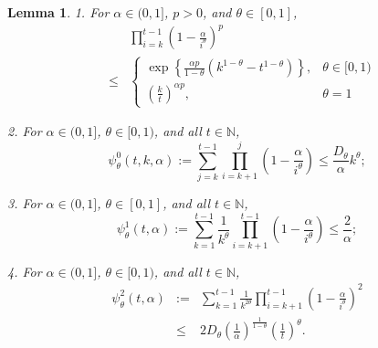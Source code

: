 \documentclass[twoside,twocolumn,journal]{IEEEtran}
\newtheorem{lem}[thm]{Lemma}
\newcommand{\DS}{\displaystyle}
\def\N{{\mathbb N}}
\begin{document}
%
%

\begin{lem} \label{lem:estimates}
1. For $\alpha\in (0,1]$, $p>0$, and $\theta\in [0,1]$,
\begin{eqnarray*}
& & \prod_{i=k}^{t-1} \left(1-\frac{\alpha}{i^\theta}\right)^p \\
& \leq & \DS
\left\{
\begin{array}{ll}
\DS \exp\left\{\frac{\alpha p}{1-\theta} (k^{1-\theta}-t^{1-\theta})\right\}, & \theta\in [0,1) \\
\DS \left(\frac{k}{t}\right)^{\alpha p}, & \theta = 1
\end{array}
\right.
\end{eqnarray*}

2. For $\alpha\in (0,1]$, $\theta\in [0,1)$, and all $t\in \N$,
\[ \psi^0_\theta(t,k,\alpha):=\sum_{j=k}^{t-1} \prod_{i=k+1}^j \left(1 - \frac{\alpha}{i^\theta} \right)
\leq \frac{D_\theta}{\alpha} k^{\theta};
\]

3. For $\alpha\in (0,1]$, $\theta\in [0,1]$, and all
$t\in \N$,
\[ \psi^1_\theta(t,\alpha):=\sum_{k=1}^{t-1} \frac{1}{k^\theta} \prod_{i=k+1}^{t-1} \left(1-\frac{\alpha}{i^\theta}\right) \leq \frac{2}{\alpha}; \]

4. For $\alpha\in (0,1]$, $\theta\in [0,1)$, and all $t\in \N$,
\begin{eqnarray*}
 \psi^2_\theta(t,\alpha) & := & \sum_{k=1}^{t-1} \frac{1}{k^{2\theta}} \prod_{i=k+1}^{t-1} \left(1-\frac{\alpha}{i^\theta}\right)^2 \\
 & \leq & 2 D_\theta \left(\frac{1}{\alpha} \right)^{\frac{1}{1-\theta}} \left(\frac{1}{t}\right)^{\theta}.
\end{eqnarray*}
\end{lem}
\end{document}
